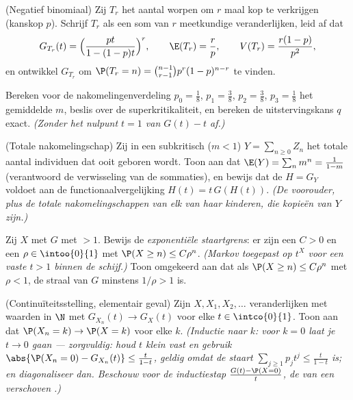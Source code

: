 \begin{exercise}[$\star\star$]\label{exo:b2:genfun:5}
(Negatief binomiaal) Zij $T_r$ het aantal worpen om $r$ maal kop te
verkrijgen (kanskop $p$). Schrijf $T_r$ als een som van $r$
 meetkundige veranderlijken, leid af dat
\[
G_{T_r}(t) = \Bigl(\frac{pt}{1 - (1-p)t}\Bigr)^{r},
\qquad
\E(T_r) = \frac rp,
\qquad
V(T_r) = \frac{r(1-p)}{p^2},
\]
en ontwikkel $G_{T_r}$ om $\P(T_r = n) = \binom{n-1}{r-1}
p^r(1-p)^{n-r}$ te vinden.
\end{exercise}

\begin{exercise}[$\star\star$]\label{exo:b2:genfun:6}
Bereken voor de nakomelingenverdeling $p_0 = \frac18$, $p_1 =
\frac38$, $p_2 = \frac38$, $p_3 = \frac18$ het gemiddelde $m$,
beslis over de superkritikaliteit, en bereken de uitstervingskans
$q$ exact. \emph{(Zonder het nulpunt $t = 1$ van $G(t) - t$ af.)}
\end{exercise}

\begin{exercise}[$\star\star\star$]\label{exo:b2:genfun:7}
(Totale nakomelingschap) Zij in een subkritisch 
($m < 1$) $Y = \sum_{n\geq0} Z_n$ het totale aantal individuen dat
ooit geboren wordt. Toon aan dat $\E(Y) = \sum_n m^n = \frac{1}{1 -
m}$ (verantwoord de verwisseling van de sommaties), en bewijs dat
de  $H = G_Y$ voldoet aan de
functionaalvergelijking $H(t) = t\,G(H(t))$. \emph{(De voorouder,
plus de totale nakomelingschappen van elk van haar kinderen, die
 kopieën van $Y$ zijn.)}
\end{exercise}

\begin{exercise}[$\star\star\star$]\label{exo:b2:genfun:8}
Zij $X$ met  $G$ met  $> 1$.
Bewijs de \emph{exponentiële staartgrens}: er zijn een $C > 0$ en
een $\rho \in \intoo{0}{1}$ met $\P(X \geq n) \leq C\rho^n$.
\emph{(Markov toegepast op $t^X$ voor een vaste $t > 1$ binnen de
schijf.)} Toon omgekeerd aan dat als $\P(X \geq n) \leq C\rho^n$
met $\rho < 1$, de straal van $G$ minstens $1/\rho > 1$ is.
\end{exercise}

\begin{exercise}[$\star\star\star$]\label{exo:b2:genfun:9}
(Continuïteitsstelling, elementair geval) Zijn $X, X_1, X_2, \dots$
veranderlijken met waarden in $\N$ met $G_{X_n}(t) \to G_X(t)$ voor
elke $t \in \intco{0}{1}$. Toon aan dat $\P(X_n = k) \to \P(X = k)$
voor elke $k$. \emph{(Inductie naar $k$: voor $k = 0$ laat je $t
\to 0$ gaan --- zorgvuldig: houd $t$ klein vast en gebruik
$\abs{\P(X_n = 0) - G_{X_n}(t)} \leq \frac{t}{1-t}$, geldig omdat
de staart $\sum_{j \geq 1}p_jt^j \leq \frac{t}{1 - t}$ is; en
diagonaliseer dan. Beschouw voor de inductiestap $\frac{G(t) - \P(X
= 0)}{t}$, de  van een verschoven .)}
\end{exercise}

